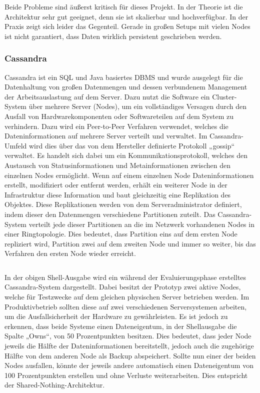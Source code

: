 Beide Probleme sind äußerst kritisch für dieses Projekt. In der Theorie ist die
Architektur sehr gut geeignet, denn sie ist skalierbar und hochverfügbar. In
der Praxis zeigt sich leider das Gegenteil. Gerade in großen Setups mit vielen
Nodes ist nicht garantiert, dass Daten wirklich persistent geschrieben werden.
\tm%

\subsubsection{Cassandra}
\label{subsubsec:cassandra}
Cassandra ist ein \gls{SQL} und Java basiertes \gls{DBMS} und wurde ausgelegt
für die Datenhaltung von großen Datenmengen und dessen verbundenem
Management der Arbeitsauslastung auf dem Server. Dazu nutzt die Software ein
Cluster-System über mehrere Server (Nodes), um ein vollständiges Versagen durch
den Ausfall von Hardwarekomponenten oder Softwareteilen auf dem System zu
verhindern. Dazu wird ein \gls{Peer-to-Peer} Verfahren verwendet, welches die
Dateninformationen auf mehrere Server verteilt und verwaltet. Im
Cassandra-Umfeld wird dies über das von dem Hersteller definierte Protokoll
„gossip“ verwaltet. Es handelt sich dabei um ein Kommunikationsprotokoll,
welches den Austausch von Statusinformationen und Metainformationen zwischen den
einzelnen Nodes ermöglicht. Wenn auf einem einzelnen Node Dateninformationen
erstellt, modifiziert oder entfernt werden, erhält ein weiterer Node in der
Infrastruktur diese Information und baut gleichzeitig eine Replikation des
Objektes. Diese Replikationen werden von dem Serveradministrator definiert,
indem dieser den Datenmengen verschiedene \gls{Partitionen} zuteilt. Das
Cassandra-System verteilt jede dieser \gls{Partitionen} an die im Netzwerk
vorhandenen Nodes in einer \gls{Ringtopologie}. Dies bedeutet, dass Partition
eins auf dem ersten Node repliziert wird, Partition zwei auf dem zweiten Node
und immer so weiter, bis das Verfahren den ersten Node wieder erreicht.

\begin{center}
    \inputminted{text}{../listings/cassandra-status.txt}
\end{center}

In der obigen Shell-Ausgabe wird ein während der Evaluierungsphase erstelltes
Cassandra-System dargestellt. Dabei besitzt der Prototyp zwei aktive Nodes,
welche für Testzwecke auf dem gleichen physischen Server betrieben werden. Im
Produktivbetrieb sollten diese auf zwei verschiedenen Serversystemen arbeiten,
um die Ausfallsicherheit der Hardware zu gewährleisten. Es ist jedoch zu
erkennen, dass beide Systeme einen Dateneigentum, in der Shellausgabe die
Spalte „Owns“, von 50 Prozentpunkten besitzen. Dies bedeutet, dass jeder Node
jeweils die Hälfte der Dateninformationen bereitstellt, jedoch auch die
zugehörige Hälfte von dem anderen Node als Backup abspeichert. Sollte nun einer
der beiden Nodes ausfallen, könnte der jeweils andere automatisch einen
Dateneigentum von 100 Prozentpunkten erstellen und ohne Verluste
weiterarbeiten. Dies entspricht der \gls{Shared-Nothing-Architektur}.


